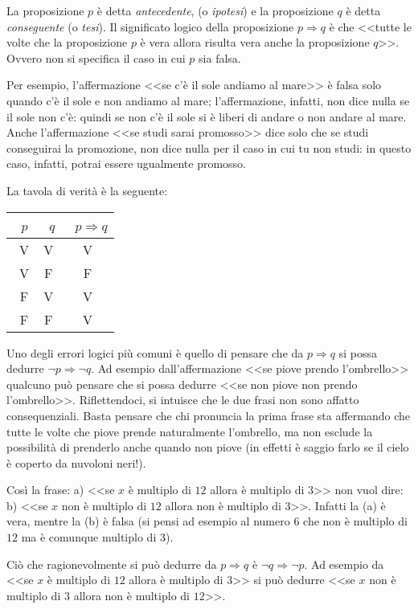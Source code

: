 La proposizione $p$ è detta \emph{antecedente}, (o \emph{ipotesi}) e la proposizione $q$ è detta \emph{conseguente} (o \emph{tesi}).
Il significato logico della proposizione $p\Rightarrow q$ è che <<tutte le volte che la proposizione $p$ è vera allora risulta vera anche la proposizione $q$>>. Ovvero non si specifica il caso in cui $p$ sia falsa.

Per esempio, l'affermazione <<se c'è il sole andiamo al mare>> è falsa solo quando c'è il sole e non andiamo al mare; l'affermazione, infatti, non dice nulla se il sole non c'è: quindi se non c'è il sole si è liberi di andare o non andare al mare. Anche l'affermazione <<se studi sarai promosso>> dice solo che se studi conseguirai la promozione, non dice nulla per il caso in cui tu non studi: in questo caso, infatti, potrai essere ugualmente promosso.

La tavola di verità è la seguente:
\begin{center}
 \begin{tabular*}{.25 \textwidth}{@{\extracolsep{\fill}}*{3}{c}}
 \toprule
~$p$ &~$q$ &~$p\Rightarrow q$\\
\midrule
~V & V & V \\
~V & F & F \\
~F & V & V \\
~F & F & V \\
\bottomrule
 \end{tabular*}
\end{center}

Uno degli errori logici più comuni è quello di pensare che da $p\Rightarrow q$ si possa dedurre  $\neg p\Rightarrow \neg q$.
Ad esempio dall'affermazione <<se piove prendo l'ombrello>> qualcuno può pensare che si possa dedurre <<se non piove non prendo l'ombrello>>. Riflettendoci, si intuisce che le due frasi non sono affatto consequenziali. Basta pensare che chi pronuncia la prima frase sta affermando che tutte le volte che piove prende naturalmente l'ombrello, ma non esclude la possibilità di prenderlo anche quando non piove (in effetti è saggio farlo se il cielo è coperto da nuvoloni neri!).

Così la frase: a) <<se $x$ è multiplo di $12$ allora è multiplo di $3$>> non vuol dire: b) <<se $x$ non è multiplo di $12$ allora non è multiplo di $3$>>.
Infatti la (a) è vera, mentre la (b) è falsa (si pensi ad esempio al numero $6$ che non è multiplo di $12$ ma è comunque multiplo di $3$).

Ciò che ragionevolmente si può dedurre da $p\Rightarrow q$ è $\neg q\Rightarrow \neg p$.
Ad esempio da <<se $x$ è multiplo di $12$ allora è multiplo di $3$>> si può dedurre <<se $x$ non è multiplo di $3$ allora non è multiplo di $12$>>.

